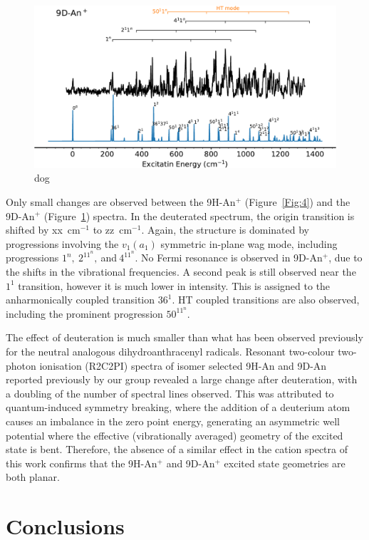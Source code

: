 \documentclass[journal=jpcafh,manuscript=article,layout=onecolumn, 12pt]{achemso}
\begin{document}
\begin{figure} [h]
	\includegraphics[width=1\textwidth]{figures/9D-An+sw}
	\caption{dog}
	\label{Fig:6}
\end{figure}

Only small changes are observed between the 9H-An$^+$ (Figure~\ref{Fig:4}) and the 9D-An$^+$ (Figure~\ref{Fig:6}) spectra. In the deuterated spectrum, the origin transition is shifted by xx~cm$^{-1}$ to zz~cm$^{-1}$. Again, the structure is dominated by progressions involving the $v_1 (a_1)$ symmetric in-plane wag mode, including progressions $1^n,~2^11^n,~$and$~4^11^n$. No Fermi resonance is observed in 9D-An$^+$, due to the shifts in the vibrational frequencies. A second peak is still observed near the $1^1$ transition, however it is much lower in intensity. This is assigned to the anharmonically coupled transition $36^1$. HT coupled transitions are also observed, including the prominent progression $50^11^n$.

The effect of deuteration is much smaller than what has been observed previously for the neutral analogous dihydroanthracenyl radicals. Resonant two-colour two-photon ionisation (R2C2PI) spectra of isomer selected 9H-An and 9D-An reported previously by our group revealed a large change after deuteration, with a doubling of the number of spectral lines observed. This was attributed to quantum-induced symmetry breaking, where the addition of a deuterium atom causes an imbalance in the zero point energy, generating an asymmetric well potential where the effective (vibrationally averaged) geometry of the excited state is bent. Therefore, the absence of a similar effect in the cation spectra of this work confirms that the 9H-An$^+$ and 9D-An$^+$ excited state geometries are both planar.

\section{Conclusions}
\end{document}
